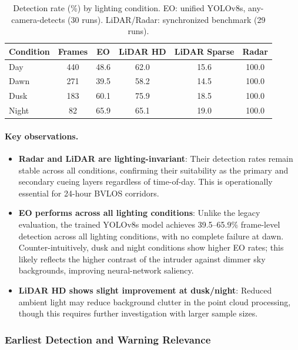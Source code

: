 \begin{table}[ht]
  \centering
  \caption{Detection rate (\%) by lighting condition. EO: unified YOLOv8s, any-camera-detects (30 runs). LiDAR/Radar: synchronized benchmark (29 runs).}
  \label{tab:det-rate-light}
  \begin{tabular}{lccccc}
    \hline
    \textbf{Condition} & \textbf{Frames} & \textbf{EO} & \textbf{LiDAR HD} & \textbf{LiDAR Sparse} & \textbf{Radar} \\
    \hline
    Day   & 440 & 48.6 & 62.0 & 15.6 & 100.0 \\
    Dawn  & 271 & 39.5 & 58.2 & 14.5 & 100.0 \\
    Dusk  & 183 & 60.1 & 75.9 & 18.5 & 100.0 \\
    Night &  82 & 65.9 & 65.1 & 19.0 & 100.0 \\
    \hline
  \end{tabular}
\end{table}

\paragraph{Key observations.}
\begin{itemize}
  \item \textbf{Radar and LiDAR are lighting-invariant}: Their detection rates remain stable across all conditions, confirming their suitability as the primary and secondary cueing layers regardless of time-of-day. This is operationally essential for 24-hour BVLOS corridors.
  \item \textbf{EO performs across all lighting conditions}: Unlike the legacy evaluation, the trained YOLOv8s model achieves 39.5--65.9\% frame-level detection across all lighting conditions, with no complete failure at dawn. Counter-intuitively, dusk and night conditions show higher EO rates; this likely reflects the higher contrast of the intruder against dimmer sky backgrounds, improving neural-network saliency.
  \item \textbf{LiDAR HD shows slight improvement at dusk/night}: Reduced ambient light may reduce background clutter in the point cloud processing, though this requires further investigation with larger sample sizes.
\end{itemize}

\subsubsection{Earliest Detection and Warning Relevance}
\label{sec:earliest-detection}

